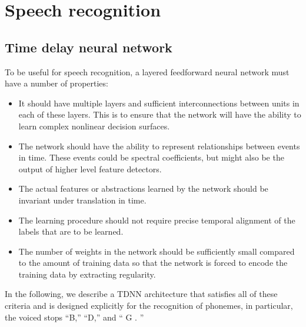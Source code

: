 
\chapter{Speech recognition}

\section{Time delay neural network}

To be useful for speech recognition, a layered feedforward neural network must have a number of properties:
\begin{itemize}
  \item 
    It should have multiple layers and sufficient interconnections between units in each of these layers. This is to ensure that the network will have the ability to learn complex nonlinear decision surfaces.
  \item
    The network should have the ability to represent relationships between events in time. These events could be spectral coefficients, but might also be the output of higher level feature detectors.    
  \item
    The actual features or abstractions learned by the network should be invariant under translation in time.    
  \item
    The learning procedure should not require precise temporal alignment of the labels that are to be learned. 
  \item
    The number of weights in the network should be sufficiently small compared to the amount of training data so that the network is forced to encode the training data by extracting regularity. 
\end{itemize}
In the following, we describe a TDNN architecture that satisfies all of these criteria and is designed explicitly for the recognition of phonemes, in particular, the voiced stops “B,” “D,” and “ G . ”

